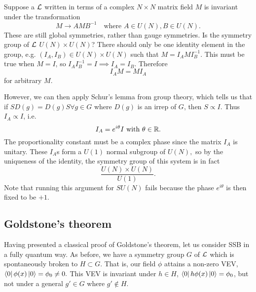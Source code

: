 \begin{exm}
    Suppose a $\mathcal L$ written in terms of a complex $N\times N$ matrix field $M$ is invariant under the transformation
    \begin{equation}
        M\to A M B^{-1}\quad \text{where }A\in U(N),B\in U(N).
    \end{equation}
    These are still global symmetries, rather than gauge symmetries. Is the symmetry group of $\mathcal L$ $U(N)\times U(N)$? There should only be one identity element in the group, e.g. $(I_A,I_B)\in U(N)\times U(N)$ such that $M=I_A M I_B^{-1}$. This must be true when $M=I$, so $I_AI_B^{-1}=I \implies I_A =I_B$. Therefore 
    \begin{equation*}
        I_AM=MI_A
    \end{equation*} for arbitrary $M$.
    
    However, we can then apply Schur's lemma from group theory, which tells us that if $SD(g)=D(g)S \forall g\in G$ where $D(g)$ is an irrep of $G$, then $S\propto I$. Thus $I_A\propto I$, i.e.
    \begin{equation*}
        I_A = e^{i\theta}I\text{ with }\theta \in \mathbb{R}.
    \end{equation*}
    The proportionality constant must be a complex phase since the matrix $I_A$ is unitary. These $I_A$s form a $U(1)$ normal subgroup of $U(N),$ so by the uniqueness of the identity, the symmetry group of this system is in fact
    \begin{equation*}
        \frac{U(N)\times U(N)}{U(1)}.
    \end{equation*}
    Note that running this argument for $SU(N)$ fails because the phase $e^{i\theta}$ is then fixed to be $+1$.
\end{exm}

\subsection*{Goldstone's theorem}
Having presented a classical proof of Goldstone's theorem, let us consider SSB in a fully quantum way. As before, we have a symmetry group $G$ of $\mathcal L$ which is spontaneously broken to $H\subset G$. That is, our field $\phi$ attains a non-zero VEV, $\left< 0 \right|\phi(x)\left| 0 \right>=\phi_0 \neq 0.$ This VEV is invariant under $h\in H$, $\left< 0 \right|h\phi(x)\left| 0 \right>=\phi_0$, but not under a general $g'\in G$ where $g'\notin H$.


